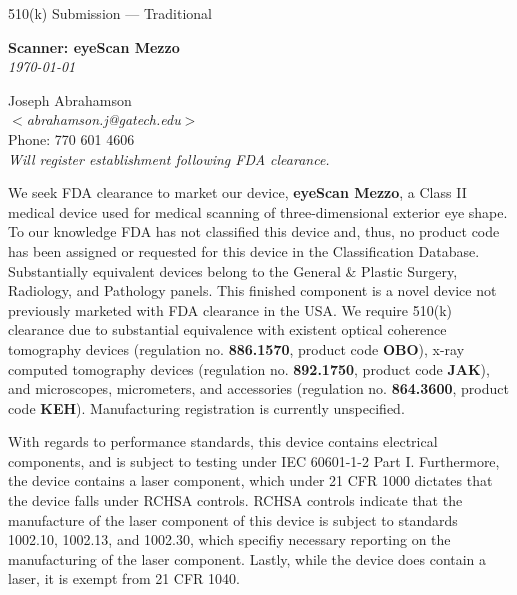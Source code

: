 \newpage
{}
\singlespacing

\begin{flushright}
  \huge{510(k) Submission --- Traditional}\\[.5in]
  
  \begin{minipage}{0.8\textwidth}
    \begin{flushright}
      \large \textbf{Scanner: eyeScan Mezzo} \\
      \textit{\today}
    \end{flushright}
  \end{minipage}
\end{flushright}

\begin{flushleft}
  Joseph Abrahamson\\
  $<$\textit{abrahamson.j@gatech.edu}$>$ \\
  Phone: 770 601 4606 \\[1em]
  
  \textit{Will register establishment following FDA clearance.}
\end{flushleft}
\vspace{4em}

\onehalfspacing

We seek FDA clearance to market our device, \textbf{eyeScan Mezzo}, a
Class II medical device used for medical scanning of three-dimensional
exterior eye shape. To our knowledge FDA has not classified this
device and, thus, no product code has been assigned or requested for
this device in the Classification Database. Substantially equivalent
devices belong to the General \& Plastic Surgery, Radiology, and
Pathology panels. This finished component is a novel device not
previously marketed with FDA clearance in the USA. We require 510(k)
clearance due to substantial equivalence with existent optical
coherence tomography devices (regulation no. \textbf{886.1570},
product code \textbf{OBO}), x-ray computed tomography devices
(regulation no. \textbf{892.1750}, product code \textbf{JAK}), and
microscopes, micrometers, and accessories (regulation
no. \textbf{864.3600}, product code \textbf{KEH}). Manufacturing
registration is currently unspecified. 

With regards to performance standards, this device contains electrical
components, and is subject to testing under IEC 60601-1-2 Part
I. Furthermore, the device contains a laser component, which under 21
CFR 1000 dictates that the device falls under RCHSA controls. RCHSA
controls indicate that the manufacture of the laser component of this
device is subject to standards 1002.10, 1002.13, and 1002.30, which
specifiy necessary reporting on the manufacturing of the laser
component. Lastly, while the device does contain a laser, it is exempt
from 21 CFR 1040.


